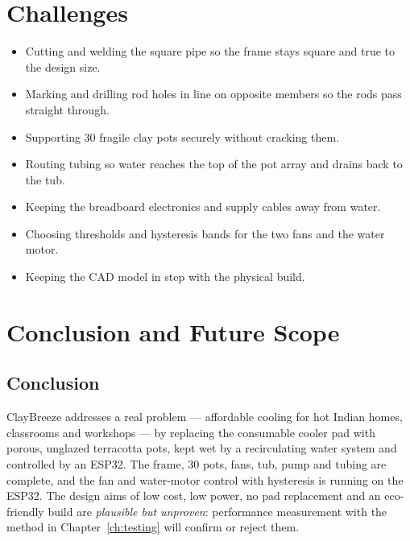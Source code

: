 \documentclass[11pt,a4paper]{report}
\begin{document}
\chapter{Challenges}
\begin{itemize}
\item Cutting and welding the square pipe so the frame stays square and true to the design size.
\item Marking and drilling rod holes in line on opposite members so the rods pass straight through.
\item Supporting 30 fragile clay pots securely without cracking them.
\item Routing tubing so water reaches the top of the pot array and drains back to the tub.
\item Keeping the breadboard electronics and supply cables away from water.
\item Choosing thresholds and hysteresis bands for the two fans and the water motor.
\item Keeping the CAD model in step with the physical build.
\end{itemize}

\chapter{Conclusion and Future Scope}

\section{Conclusion}
ClayBreeze addresses a real problem --- affordable cooling for hot Indian homes, classrooms and workshops --- by replacing the consumable cooler pad with porous, unglazed terracotta pots, kept wet by a recirculating water system and controlled by an ESP32. The frame, 30 pots, fans, tub, pump and tubing are complete, and the fan and water-motor control with hysteresis is running on the ESP32. The design aims of low cost, low power, no pad replacement and an eco-friendly build are \emph{plausible but unproven}: performance measurement with the method in Chapter~\ref{ch:testing} will confirm or reject them.
\end{document}
